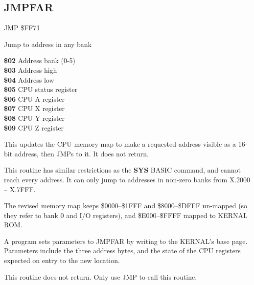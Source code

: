 \subsection{JMPFAR}
\label{KERNAL Jump Table!JMPFAR}
\begin{description}[leftmargin=2cm,style=nextline]
    \item [Address:] JMP \$FF71
    \item [Description:] Jump to address in any bank
    \item [Inputs:]
        \textbf{\$02} Address bank (0-5) \\
        \textbf{\$03} Address high \\
        \textbf{\$04} Address low \\
        \textbf{\$05} CPU status register \\
        \textbf{\$06} CPU A register \\
        \textbf{\$07} CPU X register \\
        \textbf{\$08} CPU Y register \\
        \textbf{\$09} CPU Z register
    \item [Remarks:]
        This updates the CPU memory map to make a requested address visible as a 16-bit address, then JMPs to it. It does not return.

        This routine has similar restrictions as the \textbf{SYS} BASIC command, and cannot reach every address. It can only jump to addresses in non-zero banks from X.2000 -- X.7FFF.

        The revised memory map keeps \$0000--\$1FFF and \$8000--\$DFFF un-mapped (so they refer to bank 0 and I/O registers), and \$E000--\$FFFF mapped to KERNAL ROM.

        A program sets parameters to JMPFAR by writing to the KERNAL's base page. Parameters include the three address bytes, and the state of the CPU registers expected on entry to the new location.

        This routine does not return. Only use JMP to call this routine.
    \item [Example:]
\end{description}



